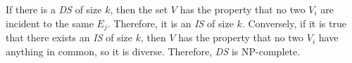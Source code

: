 \documentclass{article}
\begin{document}
\hfill

If there is a \emph{DS} of size $k$, then the set $V$ has the property that no two $V_i$ are incident to the same $E_j$. Therefore, it is an \emph{IS} of size $k$. Conversely, if it is true that there exists an \emph{IS} of size $k$, then $V$ has the property that no two $V_i$ have anything in common, so it is diverse. Therefore, \emph{DS} is NP-complete.

\newpage
 

\end{document}
